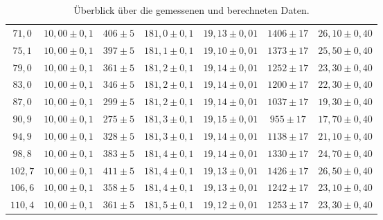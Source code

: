 \begin{table}
\begin{tabular}{ccccccc}
$71,0$ & $10,00 \pm 0,1$ & $406 \pm 5$ & $181,0 \pm 0,1$ & $19,13 \pm 0,01$ & $1406 \pm 17$ & $26,10 \pm 0,40$ \\

$75,1$ & $10,00 \pm 0,1$ & $397 \pm 5$ & $181,1 \pm 0,1$ & $19,10 \pm 0,01$ & $1373 \pm 17$ & $25,50 \pm 0,40$ \\

$79,0$ & $10,00 \pm 0,1$ & $361 \pm 5$ & $181,2 \pm 0,1$ & $19,14 \pm 0,01$ & $1252 \pm 17$ & $23,30 \pm 0,40$ \\

$83,0$ & $10,00 \pm 0,1$ & $346 \pm 5$ & $181,2 \pm 0,1$ & $19,14 \pm 0,01$ & $1200 \pm 17$ & $22,30 \pm 0,40$ \\

$87,0$ & $10,00 \pm 0,1$ & $299 \pm 5$ & $181,2 \pm 0,1$ & $19,14 \pm 0,01$ & $1037 \pm 17$ & $19,30 \pm 0,40$ \\

$90,9$ & $10,00 \pm 0,1$ & $275 \pm 5$ & $181,3 \pm 0,1$ & $19,15 \pm 0,01$ & $ 955 \pm 17$ & $17,70 \pm 0,40$ \\

$94,9$ & $10,00 \pm 0,1$ & $328 \pm 5$ & $181,3 \pm 0,1$ & $19,14 \pm 0,01$ & $1138 \pm 17$ & $21,10 \pm 0,40$ \\

$98,8$ & $10,00 \pm 0,1$ & $383 \pm 5$ & $181,4 \pm 0,1$ & $19,14 \pm 0,01$ & $1330 \pm 17$ & $24,70 \pm 0,40$ \\

$102,7$ & $10,00 \pm 0,1$ & $411 \pm 5$ & $181,4 \pm 0,1$ & $19,13 \pm 0,01$ & $1426 \pm 17$ & $26,50 \pm 0,40$ \\

$106,6$ & $10,00 \pm 0,1$ & $358 \pm 5$ & $181,4 \pm 0,1$ & $19,13 \pm 0,01$ & $1242 \pm 17$ & $23,10 \pm 0,40$ \\

$110,4$ & $10,00 \pm 0,1$ & $361 \pm 5$ & $181,5 \pm 0,1$ & $19,12 \pm 0,01$ & $1253 \pm 17$ & $23,30 \pm 0,40$ \\

\bottomrule
\end{tabular}

\caption{Überblick über die gemessenen und berechneten Daten.}
\label{tab:1}
\end{table}

